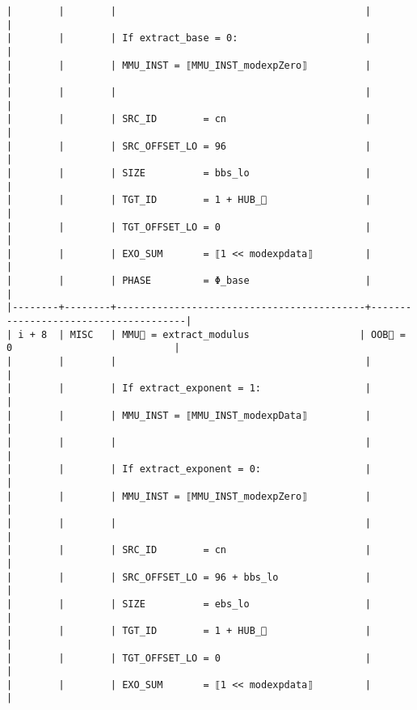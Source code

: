 \documentclass[varwidth=\maxdimen,margin=0.5cm,multi={verbatim}]{standalone}
\begin{document}
\begin{verbatim}
|        |        |                                           |                                      |
|        |        | If extract_base = 0:                      |                                      |
|        |        | MMU_INST = ⟦MMU_INST_modexpZero⟧          |                                      |
|        |        |                                           |                                      |
|        |        | SRC_ID        = cn                        |                                      |
|        |        | SRC_OFFSET_LO = 96                        |                                      |
|        |        | SIZE          = bbs_lo                    |                                      |
|        |        | TGT_ID        = 1 + HUB_                 |                                      |
|        |        | TGT_OFFSET_LO = 0                         |                                      |
|        |        | EXO_SUM       = ⟦1 << modexpdata⟧         |                                      |
|        |        | PHASE         = Φ_base                    |                                      |
|--------+--------+-------------------------------------------+--------------------------------------|
| i + 8  | MISC   | MMU🏴 = extract_modulus                   | OOB🏴 = 0                            |
|        |        |                                           |                                      |
|        |        | If extract_exponent = 1:                  |                                      |
|        |        | MMU_INST = ⟦MMU_INST_modexpData⟧          |                                      |
|        |        |                                           |                                      |
|        |        | If extract_exponent = 0:                  |                                      |
|        |        | MMU_INST = ⟦MMU_INST_modexpZero⟧          |                                      |
|        |        |                                           |                                      |
|        |        | SRC_ID        = cn                        |                                      |
|        |        | SRC_OFFSET_LO = 96 + bbs_lo               |                                      |
|        |        | SIZE          = ebs_lo                    |                                      |
|        |        | TGT_ID        = 1 + HUB_                 |                                      |
|        |        | TGT_OFFSET_LO = 0                         |                                      |
|        |        | EXO_SUM       = ⟦1 << modexpdata⟧         |                                      |

\end{verbatim}
\end{document}

